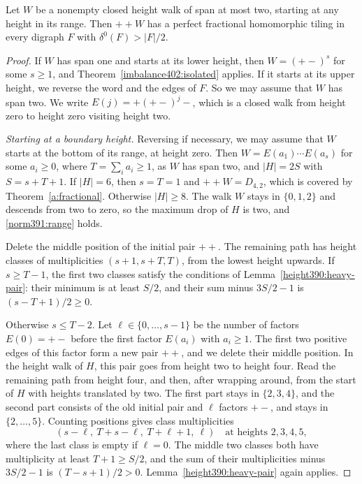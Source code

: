 \begin{theorem}
\label{height390:two-width-factor}
\label{height390:positive-first}\label{height390:zero-first}
Let $W$ be a nonempty closed height walk of span
at most two, starting at any height in its range. Then $++W$ has a perfect fractional
homomorphic tiling in every digraph $F$ with $\delta^0(F)>|F|/2$.
\end{theorem}
\begin{proof}
If $W$ has span one and starts at its lower height, then $W=(+-)^s$ for some $s\ge1$, and Theorem~\ref{imbalance402:isolated} applies. If it starts at its upper height, we reverse the
word and the edges of $F$. So we may assume that $W$ has span two. We write $E(j)=+(+-)^j-$, which is a closed walk from height zero to height zero visiting height two.

\emph{Starting at a boundary height.} Reversing if necessary, we may assume that $W$ starts at the bottom of its range, at height zero. Then $W=E(a_1)\cdots E(a_s)$ for some $a_i\ge0$, where $T=\sum_ia_i\ge1$, as $W$ has span two, and $|H|=2S$ with $S=s+T+1$.
If $|H|=6$, then $s=T=1$ and $++W=D_{4,2}$, which is covered by
Theorem~\ref{a:fractional}. Otherwise $|H|\ge8$.
The walk $W$ stays in $\{0,1,2\}$ and descends from two to zero, so the maximum drop of $H$ is two, and
\eqref{norm391:range} holds.

Delete the middle position of the initial pair $++$. The remaining path has height classes of multiplicities
$(s+1,s+T,T)$, from the lowest height upwards.
If $s\ge T-1$, the first two classes satisfy the conditions of Lemma~\ref{height390:heavy-pair}: their minimum
is at least $S/2$, and their sum minus $3S/2-1$ is
$(s-T+1)/2\ge0$.

Otherwise $s\le T-2$. Let $\ell\in\{0,\ldots,s-1\}$ be the number of
factors $E(0)=+-$ before the first factor $E(a_i)$ with $a_i\ge1$.
The first two positive edges of this factor form a new pair $++$, and we delete their middle position. In the height walk of $H$, this pair goes from height two to height four. Read the remaining path from height four, and then, after wrapping around, from the start of $H$ with heights translated by two.
The first part stays in $\{2,3,4\}$, and the second part consists of the old initial pair and $\ell$ factors $+-$, and stays in $\{2,\ldots,5\}$.
Counting positions gives class multiplicities
\[
 (s-\ell,\ T+s-\ell,\ T+\ell+1,\ \ell)
 \quad\text{at heights }2,3,4,5,
\]
where the last class is empty if $\ell=0$.
The middle two classes both have multiplicity at least $T+1\ge S/2$, and the sum of their multiplicities minus $3S/2-1$ is $(T-s+1)/2>0$.
Lemma~\ref{height390:heavy-pair} again applies.


\end{proof}

